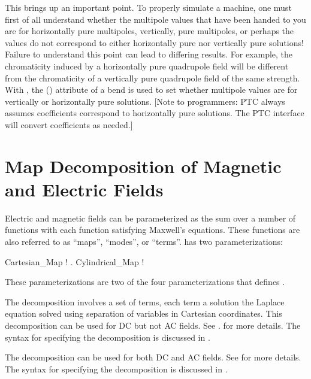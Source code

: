 This brings up an important point. To properly simulate a machine, one must first of all
understand whether the multipole values that have been handed to you are for horizontally
pure multipoles, vertically, pure multipoles, or perhaps the values do not correspond to
either horizontally pure nor vertically pure solutions! Failure to understand this point
can lead to differing results. For example, the chromaticity induced by a horizontally
pure quadrupole field will be different from the chromaticity of a vertically pure
quadrupole field of the same strength. With \bmad, the 
() attribute of a bend is used to set whether multipole values are for
vertically or horizontally pure solutions. [Note to programmers: PTC always assumes
coefficients correspond to horizontally pure solutions. The \bmad PTC interface will
convert coefficients as needed.]

\section{Map Decomposition of Magnetic and Electric Fields}
\label{s:field.map}

Electric and magnetic fields can be parameterized as the sum over a number of functions
with each function satisfying Maxwell's equations. These functions are also referred to as
``maps'', ``modes'', or ``terms''. \bmad has two parameterizations:
\begin{example}
  Cartesian_Map      ! .
  Cylindrical_Map    ! 
\end{example}
These parameterizations are two of the four  parameterizations that \bmad
defines .

The  decomposition involves a set of terms, each term a solution the
Laplace equation solved using separation of variables in Cartesian coordinates. This
decomposition can be used for DC but not AC fields. See .
for more details. The syntax for specifying the  decomposition
is discussed in .

The  decomposition can be used for both DC and AC fields. See
 for more details. The syntax for specifying the
 decomposition is discussed in .

